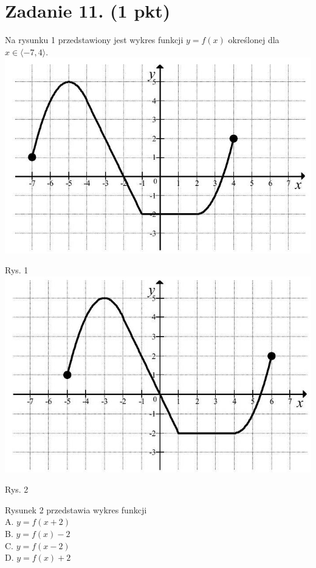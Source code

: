 \documentclass[10pt]{article}
\begin{document}
\section*{Zadanie 11. (1 pkt)}
Na rysunku 1 przedstawiony jest wykres funkcji \(y=f(x)\) określonej dla \(x \in\langle-7,4\rangle\).\\
\includegraphics[max width=\textwidth, center]{2024_11_21_e0e8aab895018a50a9a7g-04(2)}

Rys. 1\\
\includegraphics[max width=\textwidth, center]{2024_11_21_e0e8aab895018a50a9a7g-04}

Rys. 2

Rysunek 2 przedstawia wykres funkcji\\
A. \(y=f(x+2)\)\\
B. \(y=f(x)-2\)\\
C. \(y=f(x-2)\)\\
D. \(y=f(x)+2\)
\end{document}
